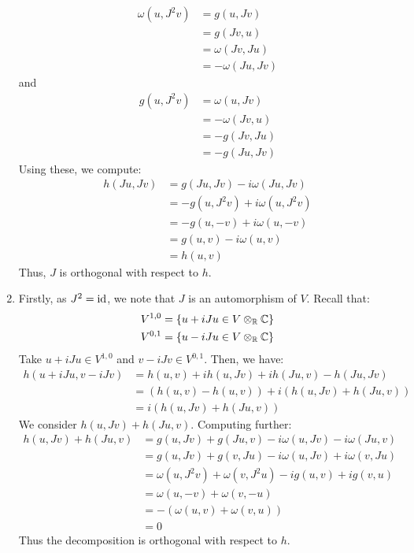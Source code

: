 \documentclass[12pt]{article}
\begin{document}
\begin{solution}
\begin{enumerate}
\begin{align*}
            \omega(u, J^2v) &= g(u, Jv) \\
            &= g(Jv, u) \\
            &= \omega(Jv, Ju) \\
            &= -\omega(Ju, Jv)
        \end{align*}
        and 
        \begin{align*}
            g(u, J^2v) &= \omega(u, Jv) \\
            &= -\omega(Jv, u) \\
            &= -g(Jv, Ju) \\
            &= -g(Ju, Jv)
        \end{align*}
        Using these, we compute:
        \begin{align*}
            h(Ju, Jv) &= g(Ju, Jv) - i\omega(Ju, Jv) \\
            &= -g(u, J^2v) + i \omega(u, J^2v) \\
            &= -g(u, -v) + i \omega(u, -v) \\
            &= g(u, v) - i \omega(u, v) \\
            &= h(u, v)
        \end{align*}
        Thus, $J$ is orthogonal with respect to $h$.
        \item Firstly, as $J^2 = \operatorname{id}$, we note that $J$ is an automorphism of $V$. Recall that: 
        \begin{align*}
            V^{1,0} &= \{ u + iJu \in V \otimes_\mathbb R \mathbb C \} \\
            V^{0,1} &= \{ u - iJu \in V \otimes_\mathbb R \mathbb C \}
        \end{align*}
        Take $u + iJu \in V^{1,0}$ and $v - iJv \in V^{0,1}$. Then, we have:
        \begin{align*}
            h(u + iJu, v - iJv) &= h(u, v) + i h(u, Jv) + ih(Ju, v) - h(Ju, Jv) \\
            &= (h(u, v) - h(u, v)) + i(h(u, Jv) + h(Ju, v)) \\
            &= i(h(u, Jv) + h(Ju, v))
        \end{align*}
        We consider $h(u, Jv) + h(Ju, v)$. Computing further:
        \begin{align*}
            h(u, Jv)+h(Ju, v) &= g(u, Jv) + g(Ju, v) -i\omega(u, Jv) -i\omega(Ju, v) \\
            &= g(u, Jv) + g(v, Ju) -i\omega(u, Jv) + i\omega(v, Ju) \\
            &= \omega(u, J^2v) + \omega(v, J^2u) -ig(u, v) +ig(v, u) \\
            &= \omega(u, -v) + \omega(v, -u) \\
            &= -(\omega(u, v) + \omega(v, u)) \\
            &= 0
        \end{align*}
        Thus the decomposition is orthogonal with respect to $h$.
    \end{enumerate}
\end{solution}
\end{document}
